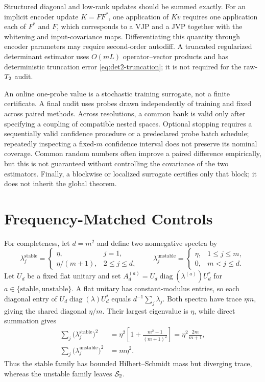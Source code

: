 Structured diagonal and low-rank updates should be summed exactly. For an
implicit encoder update $K=FF^\ast$, one application of $Kv$ requires one
application each of $F^\ast$ and $F$, which corresponds to a VJP and a JVP
together with the whitening and input-covariance maps. Differentiating this
quantity through encoder parameters may require second-order autodiff. A
truncated regularized determinant estimator uses $O(mL)$ operator--vector
products and has deterministic truncation error
\cref{eq:det2-truncation}; it is not required for the raw-$T_2$ audit.

An online one-probe value is a stochastic training surrogate, not a finite
certificate. A final audit uses probes drawn independently of training and
fixed across paired methods. Across resolutions, a common bank is valid only
after specifying a coupling of compatible nested spaces. Optional stopping
requires a sequentially valid confidence procedure or a predeclared probe
batch schedule; repeatedly inspecting a fixed-$m$ confidence interval does
not preserve its nominal coverage. Common random numbers often improve a
paired difference empirically, but this is not guaranteed without controlling
the covariance of the two estimators. Finally, a blockwise or localized
surrogate certifies only that block; it does not inherit the global theorem.


\section{Frequency-Matched Controls}
\label{app:frequency-controls}

For completeness, let $d=m^2$ and define two nonnegative spectra by
\begin{equation}
  \lambda_j^{\mathrm{stable}}
  =\begin{cases}
    \eta, & j=1,\\
    \eta/(m+1), & 2\le j\le d,
  \end{cases}
  \qquad
  \lambda_j^{\mathrm{unstable}}
  =\begin{cases}
    \eta, & 1\le j\le m,\\
    0, & m<j\le d.
  \end{cases}
  \label{eq:appendix-matched-spectrum-pair}
\end{equation}
Let $U_d$ be a fixed flat unitary and set
$A_d^{(a)}=U_d\operatorname{diag}(\lambda^{(a)})U_d^\ast$ for
$a\in\{\mathrm{stable},\mathrm{unstable}\}$. A flat unitary has
constant-modulus entries, so each diagonal entry of
$U_d\operatorname{diag}(\lambda)U_d^\ast$ equals
$d^{-1}\sum_j\lambda_j$. Both spectra have trace $\eta m$, giving the shared
diagonal $\eta/m$. Their largest eigenvalue is $\eta$, while direct summation
gives
\begin{align}
  \sum_j\bigl(\lambda_j^{\mathrm{stable}}\bigr)^2
  &=\eta^2\left[1+\frac{m^2-1}{(m+1)^2}\right]
    =\eta^2\frac{2m}{m+1}, \\
  \sum_j\bigl(\lambda_j^{\mathrm{unstable}}\bigr)^2
  &=m\eta^2.
\end{align}
Thus the stable family has bounded Hilbert--Schmidt mass but diverging trace,
whereas the unstable family leaves $\mathcal{S}_{2}$.

